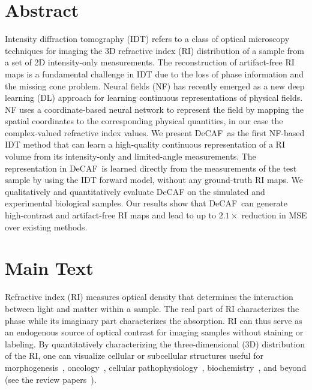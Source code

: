 \documentclass[11pt]{article}
\theoremstyle{plain} %
\def\proposed{DeCAF}
\begin{document}
\section*{Abstract}
Intensity diffraction tomography (IDT) refers to a class of optical microscopy techniques for imaging the 3D refractive index (RI) distribution of a sample from a set of 2D intensity-only measurements. The reconstruction of artifact-free RI maps is a fundamental challenge in IDT due to the loss of phase information and the missing cone problem. Neural fields (NF) has recently emerged as a new deep learning (DL) approach for learning continuous representations of physical fields. NF uses a coordinate-based neural network to represent the field by mapping the spatial coordinates to the corresponding physical quantities, in our case the complex-valued refractive index values. We present \proposed~as the first NF-based IDT method that can learn a high-quality continuous representation of a RI volume from its intensity-only and limited-angle measurements. The representation in \proposed~is learned directly from the measurements of the test sample by using the IDT forward model, without any ground-truth RI maps. We qualitatively and quantitatively evaluate DeCAF on the simulated and experimental biological samples. Our results show that \proposed~can generate high-contrast and artifact-free RI maps and lead to up to $2.1\times$ reduction in MSE over existing methods.

\section*{Main Text}
Refractive index (RI) measures optical density that determines the interaction between light and matter within a sample.
The real part of RI characterizes the phase while its imaginary part characterizes the absorption. RI can thus serve as an endogenous source of optical contrast for imaging samples without staining or labeling.
By quantitatively characterizing the three-dimensional (3D) distribution of the RI, one can visualize cellular or subcellular structures useful for morphogenesis~\cite{KimK.etal2016}, oncology~\cite{Yamada.etal2007}, cellular pathophysiology~\cite{Kim.etal2018}, biochemistry~\cite{Cooper.etal2013}, and beyond (see the review papers~\cite{Park.etal2018,Jin.etal2017}).
\end{document}
